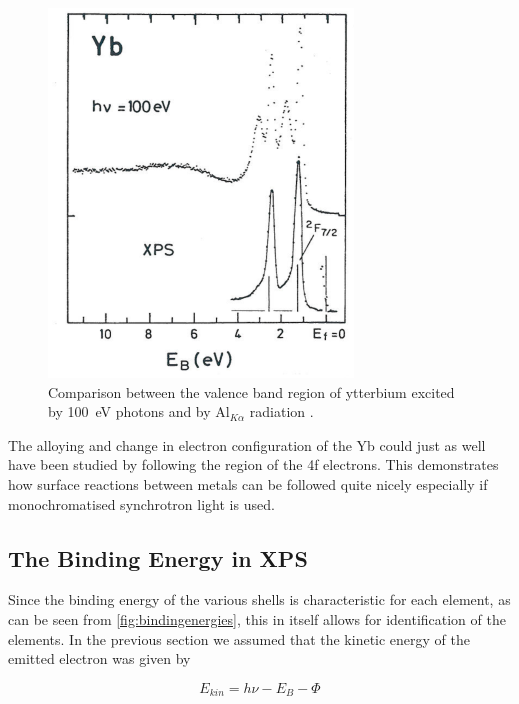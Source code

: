 \begin{figure}[h!]
	\begin{center}
	\includegraphics[scale=3.5]{figures/04_13.png}
	\caption{Comparison between the valence band region of ytterbium excited by \SI{100}{\electronvolt} photons and by Al$_{K\alpha}$ radiation \cite{gerken}.}
	\label{fig:ybvalencecomp}
	\end{center}
\end{figure}

The alloying and change in electron configuration of the Yb could just as well have been studied by following the region of the 4f electrons. This demonstrates how surface reactions between metals can be followed quite nicely especially if monochromatised synchrotron light is used.

\subsection{The Binding Energy in XPS}
Since the binding energy of the various shells is characteristic for each element, as can be seen from \autoref{fig:bindingenergies}, this in itself allows for identification of the elements. In the previous section we assumed that the kinetic energy of the emitted electron was given by

\begin{equation}
E_{kin}=h\nu-E_B-\Phi
\end{equation}

